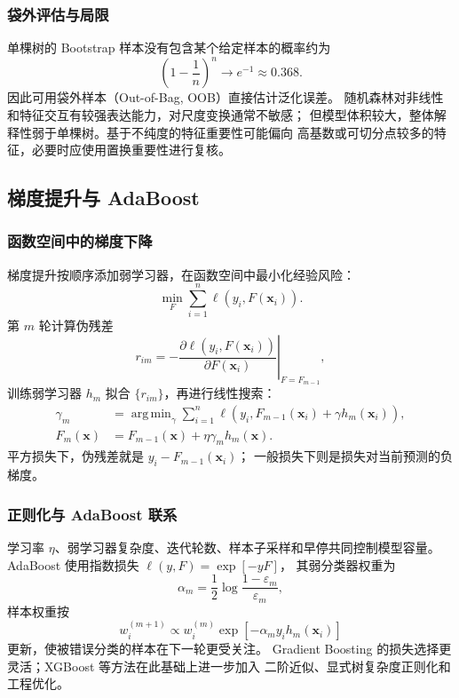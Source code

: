 \documentclass[UTF8,zihao=-4,a4paper,fontset=windows]{ctexart}
\DeclareMathOperator*{\argmin}{arg\,min}
\begin{document}
\subsubsection{袋外评估与局限}

单棵树的 Bootstrap 样本没有包含某个给定样本的概率约为
\begin{equation}
  \left(1-\frac{1}{n}\right)^n
  \longrightarrow e^{-1}\approx0.368.
\end{equation}
因此可用袋外样本（Out-of-Bag, OOB）直接估计泛化误差。
随机森林对非线性和特征交互有较强表达能力，对尺度变换通常不敏感；
但模型体积较大，整体解释性弱于单棵树。基于不纯度的特征重要性可能偏向
高基数或可切分点较多的特征，必要时应使用置换重要性进行复核。

\subsection{梯度提升与 AdaBoost}

\subsubsection{函数空间中的梯度下降}

梯度提升按顺序添加弱学习器，在函数空间中最小化经验风险\cite{friedman}：
\begin{equation}
  \min_F\sum_{i=1}^{n}\ell(y_i,F(\bm{x}_i)).
\end{equation}
第 $m$ 轮计算伪残差
\begin{equation}
  r_{im}
  =-\left.
  \frac{\partial\ell(y_i,F(\bm{x}_i))}
  {\partial F(\bm{x}_i)}
  \right|_{F=F_{m-1}},
\end{equation}
训练弱学习器 $h_m$ 拟合 $\{r_{im}\}$，再进行线性搜索：
\begin{align}
  \gamma_m
  &=\argmin_\gamma
  \sum_{i=1}^{n}
  \ell\!\left(y_i,F_{m-1}(\bm{x}_i)+
  \gamma h_m(\bm{x}_i)\right),\\
  F_m(\bm{x})
  &=F_{m-1}(\bm{x})+\eta\gamma_m h_m(\bm{x}).
\end{align}
平方损失下，伪残差就是 $y_i-F_{m-1}(\bm{x}_i)$；
一般损失下则是损失对当前预测的负梯度。

\subsubsection{正则化与 AdaBoost 联系}

学习率 $\eta$、弱学习器复杂度、迭代轮数、样本子采样和早停共同控制模型容量。
AdaBoost 使用指数损失 $\ell(y,F)=\exp[-yF]$，
其弱分类器权重为
\begin{equation}
  \alpha_m=\frac{1}{2}
  \log\frac{1-\varepsilon_m}{\varepsilon_m},
\end{equation}
样本权重按
\begin{equation}
  w_i^{(m+1)}
  \propto w_i^{(m)}
  \exp[-\alpha_m y_i h_m(\bm{x}_i)]
\end{equation}
更新，使被错误分类的样本在下一轮更受关注。
Gradient Boosting 的损失选择更灵活；XGBoost 等方法在此基础上进一步加入
二阶近似、显式树复杂度正则化和工程优化。
\end{document}
